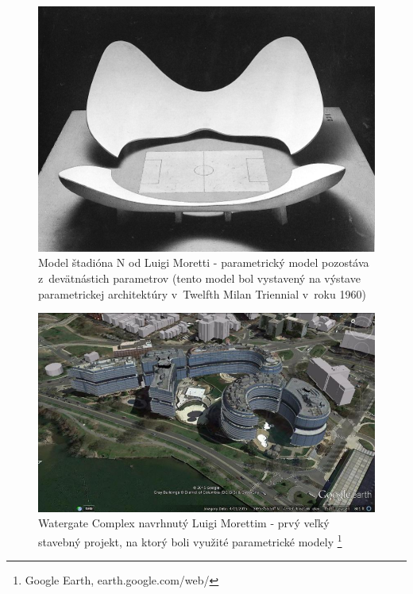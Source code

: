\begin{figure}[H]
    \centering
    \includegraphics[width = \linewidth]{obrazky-figures/moretti_1.jpg}
    \caption{Model štadióna N od Luigi Moretti - parametrický model pozostáva z~devätnástich parametrov (tento model bol vystavený na výstave parametrickej architektúry v~Twelfth Milan Triennial v~roku 1960) \cite{davis_2013}}
    \label{fig:morretiStadion}
\end{figure}

\begin{figure}[H]
    \centering
    \includegraphics[width = \linewidth]{obrazky-figures/watergate-complex.jpg}
    \caption{Watergate Complex navrhnutý Luigi Morettim - prvý veľký stavebný projekt, na ktorý boli využité parametrické modely \protect\footnote{Google Earth, earth.google.com/web/}}
    \label{fig:Watergate}
\end{figure}

